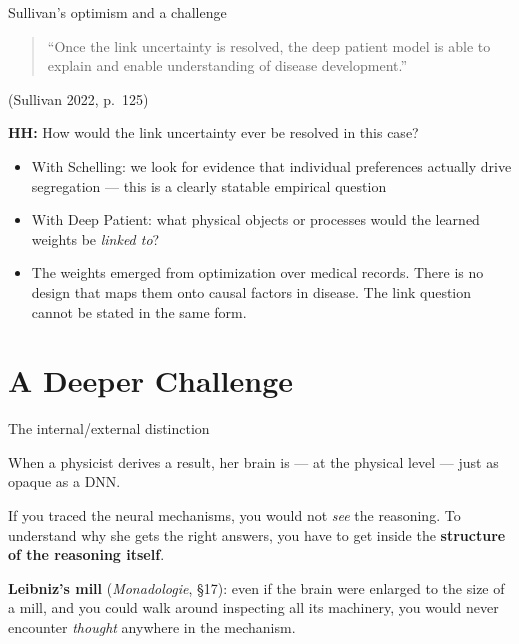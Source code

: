 \documentclass[fleql]{beamer}
\newcommand{\kw}[1]{\textbf{#1}}
\begin{document}
\begin{frame}{Sullivan's optimism and a challenge}

  \begin{quote}
  ``Once the link uncertainty is resolved, the deep patient model
  is able to explain and enable understanding of disease
  development.''
  \end{quote}
  \hfill\small (Sullivan 2022, p.~125)

  \vspace{0.8em}
  \textbf{HH:} How would the link uncertainty ever be resolved
  in this case?
  \begin{itemize}
  \item With Schelling: we look for evidence that individual
    preferences actually drive segregation --- this is a clearly
    statable empirical question
  \item With Deep Patient: what physical objects or processes
    would the learned weights be \emph{linked to}?
  \item The weights emerged from optimization over medical records.
    There is no design that maps them onto causal factors in disease.
    The link question cannot be stated in the same form.
  \end{itemize}

\end{frame}

\section{A Deeper Challenge}

\begin{frame}{The internal/external distinction}

  When a physicist derives a result, her brain is --- at the
  physical level --- just as opaque as a DNN.

  If you traced the neural mechanisms, you would not \emph{see}
  the reasoning. To understand why she gets the right answers,
  you have to get inside the \kw{structure of the reasoning itself}.

  \vspace{0.6em}
  \textbf{Leibniz's mill} (\emph{Monadologie}, \S{}17): even if
  the brain were enlarged to the size of a mill, and you could
  walk around inspecting all its machinery, you would never
  encounter \emph{thought} anywhere in the mechanism.

\end{frame}
\end{document}
